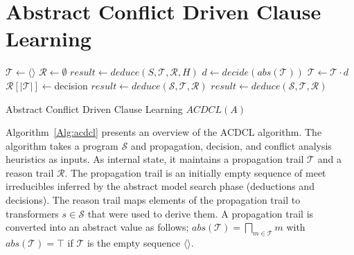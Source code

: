 \section{Abstract Conflict Driven Clause Learning}
%
\begin{algorithm2e}[t]
\DontPrintSemicolon
{}
\begin{small}
$\mathcal{T} \leftarrow \langle\rangle$ \;
$\mathcal{R} \leftarrow \emptyset$ \;
$\mathit{result} \leftarrow \mathit{deduce}(S,\mathcal{T},\mathcal{R}, H)$ \;
 {
  \return \safe}
{
 {
  \return \unsafe}
  $d \leftarrow \mathit{decide}(\mathit{abs}(\mathcal{T}))$ \;
  $\mathcal{T} \leftarrow \mathcal{T} \cdot d$ \; 
  $\mathcal{R}[|\mathcal{T}|] \leftarrow $\textsf{decision} \;
  $\mathit{result} \leftarrow \mathit{deduce}(\mathcal{S},\mathcal{T},\mathcal{R})$\;
   {
     {
      \return \safe
    }
    $\mathit{result} \leftarrow \mathit{deduce}(\mathcal{S},\mathcal{T},\mathcal{R})$ \;
  }
}
\end{small}
\caption{Abstract Conflict Driven Clause Learning $ACDCL(A)$ \label{Alg:acdcl}}
\end{algorithm2e}
%
Algorithm~\ref{Alg:acdcl} presents an overview of the ACDCL algorithm.
The algorithm takes a program $\mathcal{S}$ and propagation, decision,
and conflict analysis heuristics as inputs.  As internal state, it
maintains a propagation trail $\mathcal{T}$ and a reason trail
 $\mathcal{R}$.  The propagation trail is an initially
empty sequence of meet irreducibles inferred by the abstract model
search phase (deductions and decisions). The reason trail maps
 elements of the propagation trail to transformers
$s\in\mathcal{S}$ that were used to derive them. A propagation trail
is converted into an abstract value as follows;
$\mathit{abs}(\mathcal{T})=\bigsqcap_{m \in \mathcal{T}}m$ with
$\mathit{abs}(\mathcal{T})=\top$ if $\mathcal{T}$ is the empty
sequence $\langle\rangle$.

